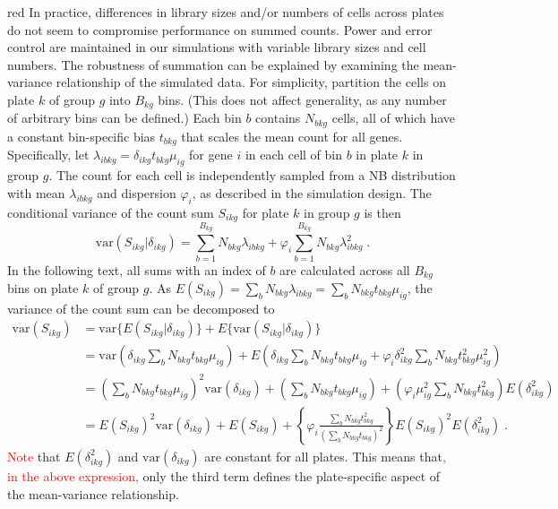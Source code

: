 \documentclass{article}
\newcommand\revised[1]{\textcolor{red}{#1}}
\begin{document}
\begin{color}{red}
In practice, differences in library sizes and/or numbers of cells across plates do not seem to compromise performance on summed counts.
Power and error control are maintained in our simulations with variable library sizes and cell numbers.
The robustness of summation can be explained by examining the mean-variance relationship of the simulated data.
For simplicity, partition the cells on plate $k$ of group $g$ into $B_{kg}$ bins.
(This does not affect generality, as any number of arbitrary bins can be defined.)
Each bin $b$ contains $N_{bkg}$ cells, all of which have a constant bin-specific bias $t_{bkg}$ that scales the mean count for all genes.
Specifically, let $\lambda_{ibkg} = \delta_{ikg}t_{bkg}\mu_{ig}$ for gene $i$ in each cell of bin $b$ in plate $k$ in group $g$.
The count for each cell is independently sampled from a NB distribution with mean $\lambda_{ibkg}$ and dispersion $\varphi_i$, as described in the simulation design.
The conditional variance of the count sum $S_{ikg}$ for plate $k$ in group $g$ is then
\[
    \mbox{var}(S_{ikg} | \delta_{ikg}) = \sum_{b=1}^{B_{kg}} N_{bkg} \lambda_{ibkg}  + \varphi_{i} \sum_{b=1}^{B_{kg}} N_{bkg} \lambda_{ibkg}^2 \;.
\]
In the following text, all sums with an index of $b$ are calculated across all $B_{kg}$ bins on plate $k$ of group $g$.
As $E(S_{ikg}) = \sum_{b} N_{bkg}\lambda_{ibkg} = \sum_{b} N_{bkg} t_{bkg} \mu_{ig}$, the variance of the count sum can be decomposed to
\begin{align*}
    \mbox{var}(S_{ikg}) 
    &= \mbox{var}\{E(S_{ikg} | \delta_{ikg} ) \} + E\{ \mbox{var}(S_{ikg} | \delta_{ikg}) \}\\
    &= \mbox{var}\left(\delta_{ikg}\sum_{b} N_{bkg} t_{bkg}\mu_{ig}\right) + E\left(\delta_{ikg}\sum_{b}  N_{bkg}t_{bkg}\mu_{ig}  + \varphi_{i} \delta_{ikg}^2 \sum_{b}  N_{bkg}t_{bkg}^2\mu_{ig}^2\right)\\
    &= \left(\sum_{b} N_{bkg} t_{bkg}\mu_{ig} \right)^2 \mbox{var}(\delta_{ikg}) + \left(\sum_{b} N_{bkg} t_{bkg}\mu_{ig}\right) + \left( \varphi_i\mu_{ig}^2 \sum_{b}  N_{bkg}t_{bkg}^2 \right) E(\delta_{ikg}^2) \\
    &= E(S_{ikg})^2 \mbox{var}(\delta_{ikg}) + E(S_{ikg}) + \left\{ \varphi_i \frac{\sum_{b} N_{bkg} t_{bkg}^2}{ (\sum_{b} N_{bkg} t_{bkg})^2}  \right\} E(S_{ikg})^2 E(\delta_{ikg}^2) \;. 
\end{align*}
\revised{Note} that $E(\delta_{ikg}^2)$ and $\mbox{var}(\delta_{ikg})$ are constant for all plates.
This means that\revised{, in the above expression,} only the third term defines the plate-specific aspect of the mean-variance relationship.

\end{color}
\end{document}
